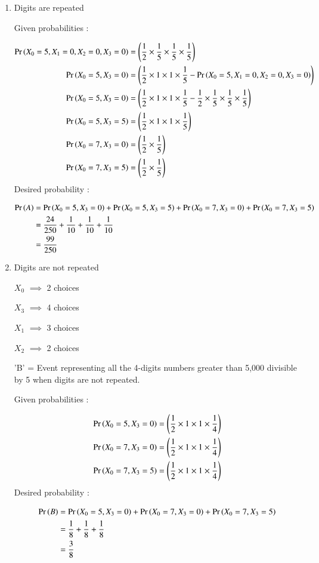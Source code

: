 \documentclass[journal,12pt,onecolumn]{IEEEtran}
\begin{document}
\begin{enumerate}
\item Digits are repeated

 \begin{table}[h]
\begin{center}
		
		\caption{}
		\label{tab:xxx}
\end{center}	
	\end{table}

Given probabilities :

\begin{align}
\Pr\left(X_0=5,X_1=0,X_2=0,X_3=0\right) &= \left(\frac{1}{2}\times\frac{1}{5}\times\frac{1}{5}\times\frac{1}{5} \right) \\
\Pr\left(X_0=5,X_3=0\right) &= \left(\frac{1}{2}\times1\times1\times\frac{1}{5} - \Pr\left(X_0=5,X_1=0,X_2=0,X_3=0\right) \right) \\
\Pr\left(X_0=5,X_3=0\right) &= \left(\frac{1}{2}\times1\times1\times\frac{1}{5} - \frac{1}{2}\times\frac{1}{5}\times\frac{1}{5}\times\frac{1}{5} \right) \\
\Pr\left(X_0=5,X_3=5\right) &= \left(\frac{1}{2}\times1\times1\times\frac{1}{5}\right) \\
\Pr\left(X_0=7,X_3=0\right) &= \left(\frac{1}{2}\times\frac{1}{5} \right) \\
\Pr\left(X_0=7,X_3=5\right) &= \left(\frac{1}{2}\times\frac{1}{5} \right) 
\end{align}
Desired probability :

\begin{align}
\Pr\left(A\right) &= \Pr\left(X_0=5,X_3=0\right) + \Pr\left(X_0=5,X_3=5\right) + \Pr\left(X_0=7,X_3=0\right) + \Pr\left(X_0=7,X_3=5\right) \\
 &=\frac{24}{250} + \frac{1}{10} + \frac{1}{10} + \frac{1}{10}\\
&= \frac{99}{250}
 \end{align}

\item Digits are not repeated 
    \begin{center}
    $X_0$ $\implies$ 2 choices

    $X_3$ $\implies$ 4 choices

    $X_1$ $\implies$ 3 choices

    $X_2$ $\implies$ 2 choices
    \end{center}

'B' = Event representing all the 4-digits numbers greater than 5,000 divisible by 5 when digits are not repeated.

Given probabilities :

\begin{align}
\Pr\left(X_0=5,X_3=0\right) &= \left(\frac{1}{2}\times1\times1\times\frac{1}{4} \right) \\
\Pr\left(X_0=7,X_3=0\right) &= \left(\frac{1}{2}\times1\times1\times\frac{1}{4}\right) \\
\Pr\left(X_0=7,X_3=5\right) &= \left(\frac{1}{2}\times1\times1\times\frac{1}{4}\right) 
\end{align}
Desired probability :

\begin{align}
\Pr\left(B\right) &= \Pr\left(X_0=5,X_3=0\right) + \Pr\left(X_0=7,X_3=0\right) + \Pr\left(X_0=7,X_3=5\right) \\
&= \frac{1}{8} + \frac{1}{8} + \frac{1}{8} \\
&= \frac{3}{8}
\end{align}
\end{enumerate}
\end{document}
